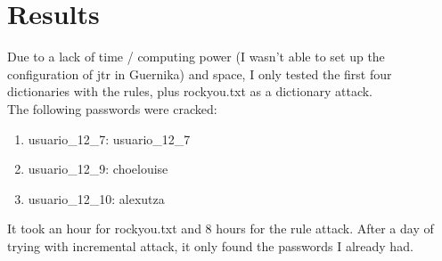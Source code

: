 \section{Results}
Due to a lack of time / computing power (I wasn't able to set up the configuration of jtr in Guernika) and space, I only tested the first four dictionaries with the rules, plus rockyou.txt as a dictionary attack.\\

The following passwords were cracked:
\begin{enumerate}
    \item usuario\_12\_7: usuario\_12\_7
    \item usuario\_12\_9: choelouise
    \item usuario\_12\_10: alexutza
\end{enumerate}

It took an hour for rockyou.txt and 8 hours for the rule attack. After a day of trying with incremental attack, it only found the passwords I already had.
